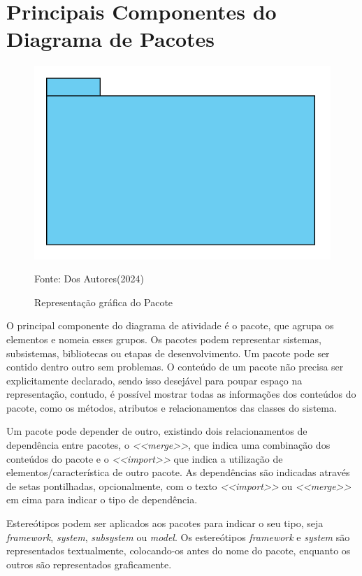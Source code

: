 \documentclass[12pt,openright,oneside,a4paper,
	chapter=TITLE,
	section=TITLE,
	english,brazil]{abntex2}
\begin{document}
\section{Principais Componentes do Diagrama de Pacotes}

\begin{figure}
	\caption{Representação gráfica do Pacote}
	\centering
	\includegraphics[scale=0.5]{img/Pacote.png}
	\\

	\label{ElementoPacote}
	\footnotesize\raggedright Fonte: Dos Autores(2024)
\end{figure}

O principal componente do diagrama de atividade é o pacote, que agrupa os elementos e nomeia esses grupos. Os pacotes podem representar sistemas, subsistemas, bibliotecas ou etapas de desenvolvimento. Um pacote pode ser contido dentro outro sem problemas. O conteúdo de um pacote não precisa ser explicitamente declarado, sendo isso desejável para poupar espaço na representação, contudo, é possível mostrar todas as informações dos conteúdos do pacote, como os métodos, atributos e relacionamentos das classes do sistema.

Um pacote pode depender de outro, existindo dois relacionamentos de dependência entre pacotes, o \textit{<<merge>>}, que indica uma combinação dos conteúdos do pacote  e o \textit{<<import>>} que indica a utilização de elementos/característica de outro pacote.  As dependências são indicadas através de setas pontilhadas, opcionalmente, com o texto \textit{<<import>>} ou \textit{<<merge>>} em cima para indicar o tipo de dependência.

Estereótipos podem ser aplicados aos pacotes para indicar o seu tipo, seja \textit{framework}, \textit{system}, \textit{subsystem} ou \textit{model}. Os estereótipos \textit{framework} e \textit{system} são representados textualmente, colocando-os antes do nome do pacote, enquanto os outros são representados graficamente.
\end{document}
